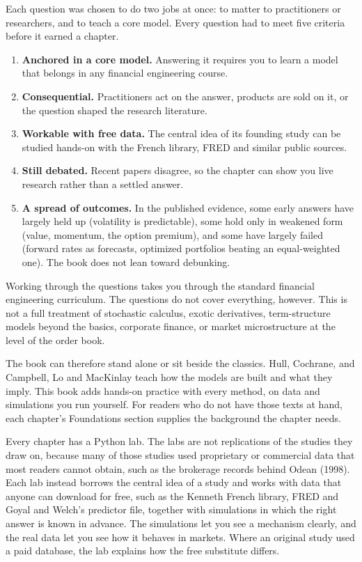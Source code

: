 Each question was chosen to do two jobs at once: to matter to practitioners or researchers, and to teach a core model. Every question had to meet five criteria before it earned a chapter.

\begin{enumerate}
  \item \textbf{Anchored in a core model.} Answering it requires you to learn a model that belongs in any financial engineering course.
  \item \textbf{Consequential.} Practitioners act on the answer, products are sold on it, or the question shaped the research literature.
  \item \textbf{Workable with free data.} The central idea of its founding study can be studied hands-on with the French library, FRED and similar public sources.
  \item \textbf{Still debated.} Recent papers disagree, so the chapter can show you live research rather than a settled answer.
  \item \textbf{A spread of outcomes.} In the published evidence, some early answers have largely held up (volatility is predictable), some hold only in weakened form (value, momentum, the option premium), and some have largely failed (forward rates as forecasts, optimized portfolios beating an equal-weighted one). The book does not lean toward debunking.
\end{enumerate}

Working through the questions takes you through the standard financial engineering curriculum. The questions do not cover everything, however. This is not a full treatment of stochastic calculus, exotic derivatives, term-structure models beyond the basics, corporate finance, or market microstructure at the level of the order book.

The book can therefore stand alone or sit beside the classics. Hull, Cochrane, and Campbell, Lo and MacKinlay teach how the models are built and what they imply. This book adds hands-on practice with every method, on data and simulations you run yourself. For readers who do not have those texts at hand, each chapter's Foundations section supplies the background the chapter needs.

Every chapter has a Python lab. The labs are not replications of the studies they draw on, because many of those studies used proprietary or commercial data that most readers cannot obtain, such as the brokerage records behind Odean (1998). Each lab instead borrows the central idea of a study and works with data that anyone can download for free, such as the Kenneth French library, FRED and Goyal and Welch's predictor file, together with simulations in which the right answer is known in advance. The simulations let you see a mechanism clearly, and the real data let you see how it behaves in markets. Where an original study used a paid database, the lab explains how the free substitute differs.

